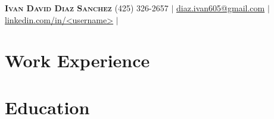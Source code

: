 \documentclass[letterpaper, 11pt]{article}
\begin{document}
\begin{center}
  \textbf{\Huge \scshape Ivan David Diaz Sanchez}
  \small (425) 326-2657 $|$
  \underline{diaz.ivan605@gmail.com} $|$
  \underline{linkedin.com/in/<username>} $|$
\end{center}


\section{Work Experience}


\section{Education}
\end{document}
